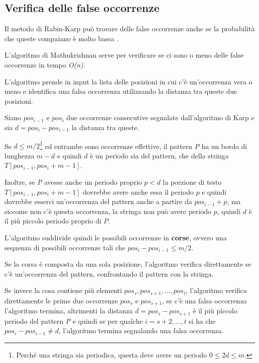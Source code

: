 \subsection{Verifica delle false occorrenze}\label{verifica-delle-false-occorrenze}

Il metodo di Rabin-Karp può trovare delle false occorrenze anche se la probabilità che queste compaiano è molto bassa .

L'algoritmo di Mathukrishnan serve per verificare se ci sono o meno delle false occorrenze in tempo \emph{O(n)}.

L'algoritmo prende in input la lista delle posizioni in cui c'è un'occorrenza vera o meno e identifica una falsa occorrenza utilizzando la distanza tra queste due posizioni.

Siano $ pos_{i-1} $ e $ pos_{i} $ due occorrenze consecutive segnalate dall'algoritmo di Karp e sia $ d = pos_{i} - pos_{i-1}$ la distanza tra queste.

Se $ d \leq m/2 $\footnote{Perché una stringa sia periodica, questa deve avere un periodo $ 0 \leq 2d \leq m $.} ed entrambe sono occorrenze effettive, il pattern \textit{P} ha un bordo di lunghezza $ m -d $ e quindi $ d  $ è un periodo sia del pattern, che della stringa $ T[pos_{i-1}, pos_{i} +m -1] $.

Inoltre, se \textit{P} avesse anche un periodo proprio $ p < d $ la porzione di testo $ T[pos_{i-1}, pos_{i} +m -1] $ dovrebbe avere anche essa il periodo $ p $ e quindi dovrebbe esserci un'occorrenza del pattern anche a partire da $ pos_{i-1} + p$, ma siccome non c'è questa occorrenza, la stringa non può avere periodo $ p $, quindi $ d $ è il più piccolo periodo proprio di $ P $.

L'algoritmo suddivide quindi le possibili occorrenze in \textbf{corse}, ovvero una sequenza di possibili occorrenze tali che $ pos_{i} - pos_{i-1} \leq m/2  $.

Se la corsa è composta da una sola posizione, l'algoritmo verifica direttamente se c'è un'occorrenza del pattern, confrontando il pattern con la stringa.

Se invece la cosa contiene più elementi $ pos_s, pos_{s+1}, \ldots, pos_{t} $, l'algoritmo verifica direttamente le prime due occorrenze $pos_{s}$ e $ pos_{s+1} $, se c'è una falsa occorrenza l'algoritmo termina, altrimenti la distanza $ d = pos_{s} - pos_{s+1} $ è il più piccolo periodo del pattern \textit{P} e quindi se per qualche $ i = s+2, \ldots, t  $ si ha che $ pos_i - pos_{i-1} \neq d $, l'algoritmo termina segnalando una falsa occorrenza.

